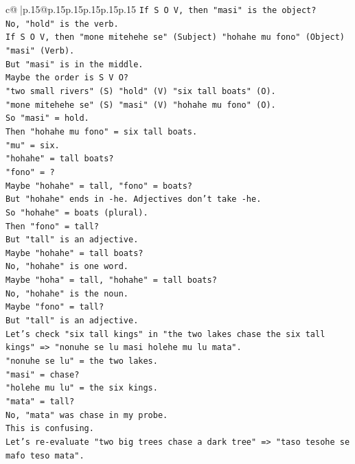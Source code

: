 \documentclass{article}
\begin{document}
{\begin{supertabular}{c@{$\;$}|p{.15\linewidth}@{}p{.15\linewidth}p{.15\linewidth}p{.15\linewidth}p{.15\linewidth}p{.15\linewidth}}
{{{\texttt{If S O V, then "masi" is the object?} \\
\texttt{No, "hold" is the verb.} \\
\texttt{If S O V, then "mone mitehehe se" (Subject) "hohahe mu fono" (Object) "masi" (Verb).} \\
\texttt{But "masi" is in the middle.} \\
\texttt{Maybe the order is S V O?} \\
\texttt{"two small rivers" (S) "hold" (V) "six tall boats" (O).} \\
\texttt{"mone mitehehe se" (S) "masi" (V) "hohahe mu fono" (O).} \\
\texttt{So "masi" = hold.} \\
\texttt{Then "hohahe mu fono" = six tall boats.} \\
\texttt{"mu" = six.} \\
\texttt{"hohahe" = tall boats?} \\
\texttt{"fono" = ?} \\
\texttt{Maybe "hohahe" = tall, "fono" = boats?} \\
\texttt{But "hohahe" ends in {-}he. Adjectives don't take {-}he.} \\
\texttt{So "hohahe" = boats (plural).} \\
\texttt{Then "fono" = tall?} \\
\texttt{But "tall" is an adjective.} \\
\texttt{Maybe "hohahe" = tall boats?} \\
\texttt{No, "hohahe" is one word.} \\
\texttt{Maybe "hoha" = tall, "hohahe" = tall boats?} \\
\texttt{No, "hohahe" is the noun.} \\
\texttt{Maybe "fono" = tall?} \\
\texttt{But "tall" is an adjective.} \\
\texttt{Let's check "six tall kings" in "the two lakes chase the six tall kings" => "nonuhe se lu masi holehe mu lu mata".} \\
\texttt{"nonuhe se lu" = the two lakes.} \\
\texttt{"masi" = chase?} \\
\texttt{"holehe mu lu" = the six kings.} \\
\texttt{"mata" = tall?} \\
\texttt{No, "mata" was chase in my probe.} \\
\texttt{This is confusing.} \\
\texttt{Let's re{-}evaluate "two big trees chase a dark tree" => "taso tesohe se mafo teso mata".} \\
}}}
\end{supertabular}}
\end{document}
